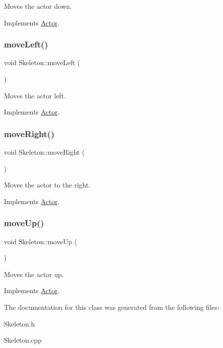 Moves the actor down. 



Implements \mbox{\hyperlink{classActor_ad2737cd62ea0c96f75853afb5d1fd83a}{Actor}}.

\mbox{\label{classSkeleton_ab03c65cdabc94f280443691653112d3a}} 
\subsubsection{\texorpdfstring{moveLeft()}{moveLeft()}}
{\footnotesize\ttfamily void Skeleton\+::move\+Left (\begin{DoxyParamCaption}{ }\end{DoxyParamCaption})\hspace{0.3cm}{\ttfamily [virtual]}}



Moves the actor left. 



Implements \mbox{\hyperlink{classActor_a522d6069bacaa9985db7a234bde2c8b6}{Actor}}.

\mbox{\label{classSkeleton_a3d8ce7b8a1d10e4a33a27f0eee54042e}} 
\subsubsection{\texorpdfstring{moveRight()}{moveRight()}}
{\footnotesize\ttfamily void Skeleton\+::move\+Right (\begin{DoxyParamCaption}{ }\end{DoxyParamCaption})\hspace{0.3cm}{\ttfamily [virtual]}}



Moves the actor to the right. 



Implements \mbox{\hyperlink{classActor_a9176d8f8ec68fcbd91c48223e7c65775}{Actor}}.

\mbox{\label{classSkeleton_a0ddbea7574ada0b5cef0cadbd4a0dd9f}} 
\subsubsection{\texorpdfstring{moveUp()}{moveUp()}}
{\footnotesize\ttfamily void Skeleton\+::move\+Up (\begin{DoxyParamCaption}{ }\end{DoxyParamCaption})\hspace{0.3cm}{\ttfamily [virtual]}}



Moves the actor up. 



Implements \mbox{\hyperlink{classActor_afaa299f90233461ee4df96dcfda3008a}{Actor}}.



The documentation for this class was generated from the following files\+:\begin{DoxyCompactItemize}
\item 
Skeleton.\+h\item 
Skeleton.\+cpp\end{DoxyCompactItemize}
